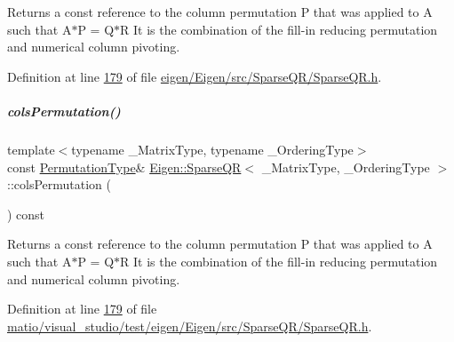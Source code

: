 \begin{DoxyReturn}{Returns}
a const reference to the column permutation P that was applied to A such that A$\ast$P = Q$\ast$R It is the combination of the fill-\/in reducing permutation and numerical column pivoting. 
\end{DoxyReturn}


Definition at line \hyperlink{eigen_2_eigen_2src_2_sparse_q_r_2_sparse_q_r_8h_source_l00179}{179} of file \hyperlink{eigen_2_eigen_2src_2_sparse_q_r_2_sparse_q_r_8h_source}{eigen/\+Eigen/src/\+Sparse\+Q\+R/\+Sparse\+Q\+R.\+h}.

\mbox{\label{group___sparse_q_r___module_a140930ebbf89dfd57a173761716db38f}} 
\subparagraph{\texorpdfstring{cols\+Permutation()}{colsPermutation()}\hspace{0.1cm}{\footnotesize\ttfamily [2/2]}}
{\footnotesize\ttfamily template$<$typename \+\_\+\+Matrix\+Type, typename \+\_\+\+Ordering\+Type$>$ \\
const \hyperlink{group___core___module}{Permutation\+Type}\& \hyperlink{group___sparse_q_r___module_class_eigen_1_1_sparse_q_r}{Eigen\+::\+Sparse\+QR}$<$ \+\_\+\+Matrix\+Type, \+\_\+\+Ordering\+Type $>$\+::cols\+Permutation (\begin{DoxyParamCaption}{ }\end{DoxyParamCaption}) const\hspace{0.3cm}{\ttfamily [inline]}}

\begin{DoxyReturn}{Returns}
a const reference to the column permutation P that was applied to A such that A$\ast$P = Q$\ast$R It is the combination of the fill-\/in reducing permutation and numerical column pivoting. 
\end{DoxyReturn}


Definition at line \hyperlink{matio_2visual__studio_2test_2eigen_2_eigen_2src_2_sparse_q_r_2_sparse_q_r_8h_source_l00179}{179} of file \hyperlink{matio_2visual__studio_2test_2eigen_2_eigen_2src_2_sparse_q_r_2_sparse_q_r_8h_source}{matio/visual\+\_\+studio/test/eigen/\+Eigen/src/\+Sparse\+Q\+R/\+Sparse\+Q\+R.\+h}.


